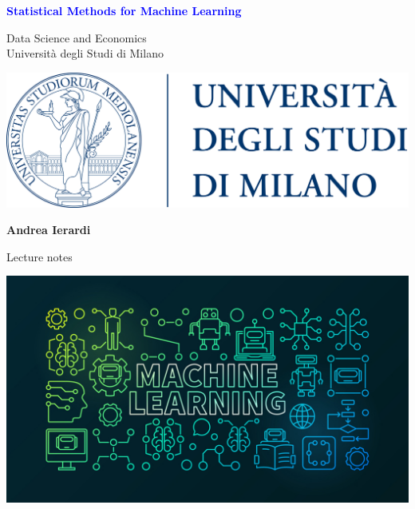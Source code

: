 \documentclass[a4paper,12pt]{report}
\newcommand\col[2]{\textcolor{#2}{#1}}
\begin{document}
\begin{titlepage}
    \begin{center}
        \vspace*{0.1cm}
            
        \Huge
        \textbf{\col{Statistical Methods for Machine Learning}{Blue}}
            
        \vspace{0.5cm}
        \LARGE
        Data Science and Economics \\
                    Università degli Studi di Milano\\
                            \vspace{0.5cm}

 \includegraphics[width=.5\linewidth]{unimi}

        \vspace{1.5cm}
            
        \textbf{Andrea Ierardi}
            
        \vfill
            
        Lecture notes
            
        \vspace{1cm}
            
 \includegraphics[width=0.9\linewidth]{front}
                        
    \end{center}
\end{titlepage}


\newpage

\tableofcontents
\newpage
\end{document}
